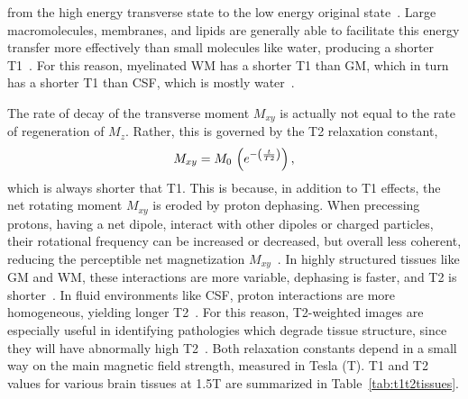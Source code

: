 from the high energy transverse state to the low energy original state~\cite{Bloch1946,Bryant2005}.
Large macromolecules, membranes, and lipids are generally able to facilitate this energy transfer
more effectively than small molecules like water, producing a shorter T1~\cite{Koenig1990}.
For this reason, myelinated WM has a shorter T1 than GM,
which in turn has a shorter T1 than CSF, which is mostly water~\cite{Roberts2007}.
\par
The rate of decay of the transverse moment $M_{xy}$
is actually not equal to the rate of regeneration of $M_z$.
Rather, this is governed by the T2 relaxation constant,
\begin{equation}
  M_{xy} = M_0\et\left(e^{-\left(\frac{t}{T2}\right)}\right),%
  \label{eq:T2}
\end{equation}
which is always shorter that T1.
This is because, in addition to T1 effects,
the net rotating moment $M_{xy}$ is eroded by proton dephasing.
When precessing protons, having a net dipole, interact with other dipoles or charged particles,
their rotational frequency can be increased or decreased, but overall less coherent,
reducing the perceptible net magnetization $M_{xy}$~\cite{Bloch1946}.
In highly structured tissues like GM and WM, these interactions are more variable, 
dephasing is faster, and T2 is shorter~\cite{Roberts2007}.
In fluid environments like CSF, proton interactions are more homogeneous,
yielding longer T2~\cite{Roberts2007}.
For this reason, T2-weighted images are especially useful in identifying pathologies
which degrade tissue structure, since they will have abnormally high T2~\cite{Roberts2007}.
Both relaxation constants depend in a small way on the main magnetic field strength,
measured in Tesla (T).
T1 and T2 values for various brain tissues at 1.5T are summarized in Table~\ref{tab:t1t2tissues}.
\par
\begin{table}
  \caption{T1 and T2 constants for brain tissues at 1.5 Tesla.}%
  \label{tab:t1t2tissues}
\end{table}
